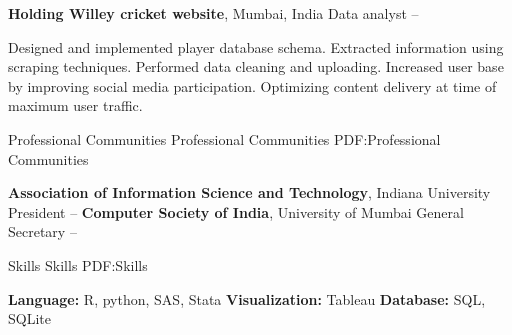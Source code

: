 \documentclass[a4paper]{simpleresumecv}
\begin{document}
\begin{Body}
{\textbf{Holding Willey cricket website}}, Mumbai, India
\Gap
Data analyst
\hfill
{} --
\begin{Detail}
\Item
Designed and implemented player database schema. Extracted information using scraping techniques. Performed data cleaning and uploading.
\Item
Increased user base by improving social media participation. Optimizing content delivery at time of maximum user traffic.
\end{Detail}

\Section
{Professional Communities}
{Professional Communities}
{PDF:Professional Communities}


{\textbf{Association of Information Science and Technology}}, Indiana University
\Gap
\SubBulletItem
President
\hfill
{} --
\Gap
{\textbf{Computer Society of India}}, University of Mumbai
\Gap
\SubBulletItem
General Secretary
\hfill
{} --



\Section
{Skills}
{Skills}
{PDF:Skills}

\Entry
{\textbf{Language:}} R, python, SAS, Stata
\Gap
{\textbf{Visualization:}} Tableau
\Gap
{\textbf{Database:}} SQL, SQLite
\end{Body}

\end{document}
